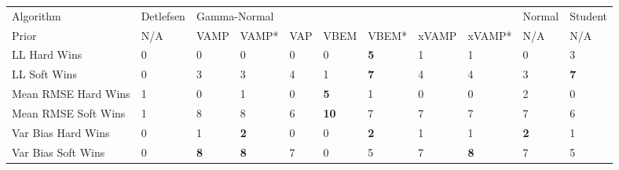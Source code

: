 \begin{tabular}{lllllllllll}
\toprule
Algorithm & Detlefsen & \multicolumn{7}{l}{Gamma-Normal} &      Normal &     Student \\
Prior &       N/A &         VAMP &       VAMP* & VAP &         VBEM &       VBEM* & xVAMP &      xVAMP* &         N/A &         N/A \\
\midrule
LL Hard Wins        &         0 &            0 &           0 &   0 &            0 &  \textbf{5} &     1 &           1 &           0 &           3 \\
LL Soft Wins        &         0 &            3 &           3 &   4 &            1 &  \textbf{7} &     4 &           4 &           3 &  \textbf{7} \\
Mean RMSE Hard Wins &         1 &            0 &           1 &   0 &   \textbf{5} &           1 &     0 &           0 &           2 &           0 \\
Mean RMSE Soft Wins &         1 &            8 &           8 &   6 &  \textbf{10} &           7 &     7 &           7 &           7 &           6 \\
Var Bias Hard Wins  &         0 &            1 &  \textbf{2} &   0 &            0 &  \textbf{2} &     1 &           1 &  \textbf{2} &           1 \\
Var Bias Soft Wins  &         0 &   \textbf{8} &  \textbf{8} &   7 &            0 &           5 &     7 &  \textbf{8} &           7 &           5 \\
\bottomrule
\end{tabular}

